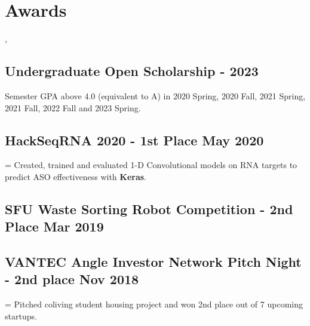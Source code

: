 \documentclass[]{Keval-resume}
\newlength\boxwid%
\let\oldtextbullet=\textbullet
\def\textbullet{%
    \settowidth{\boxwid}{\indent\oldtextbullet\ }%
    \hangindent=\boxwid%
    \oldtextbullet}
\begin{document}
\section{Awards}
\sep
\hrulefill
\postsectionsep

\subsection{Undergraduate Open Scholarship \hfill {} - 2023}
Semester GPA above 4.0 (equivalent to A) in 2020 Spring, 2020 Fall, 2021 Spring, 2021 Fall, 2022 Fall and 2023 Spring.
\postsectionsep

\subsection{HackSeqRNA 2020 - 1st Place \hfill \normalfont May 2020}
\textbullet{} Created, trained and evaluated 1-D Convolutional models on RNA targets to predict ASO effectiveness with \textbf{Keras}.\\
\postsectionsep  

\subsection{SFU Waste Sorting Robot Competition - 2nd Place \hfill \normalfont Mar 2019}
\postsectionsep 

\subsection{VANTEC Angle Investor Network Pitch Night - 2nd place \hfill \normalfont  Nov 2018}
\textbullet{} Pitched coliving student housing project and won 2nd place out of 7 upcoming startups.
\postsectionsep  

\sectionsep



\end{document}
